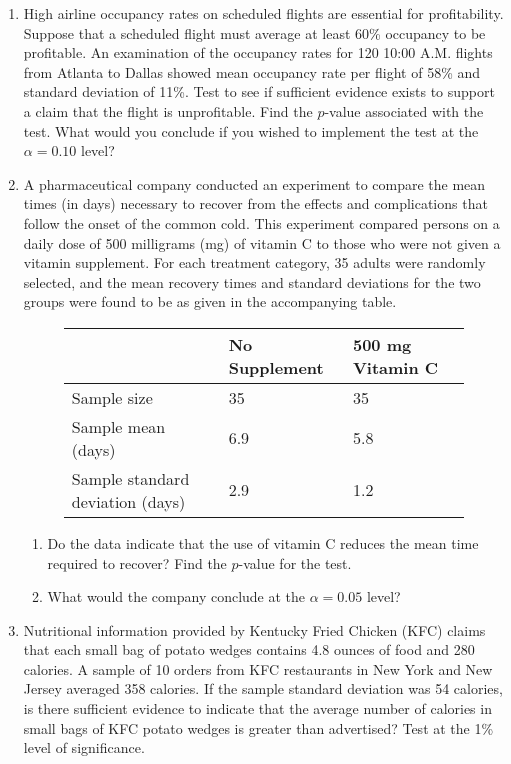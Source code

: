 \documentclass[12pt]{article}
\begin{document}
\begin{enumerate}
\item High airline occupancy rates on scheduled flights are essential for profitability. Suppose that a scheduled flight must average at least 60\% occupancy to be profitable. An examination of the occupancy rates for 120 10:00 A.M. flights from Atlanta to Dallas showed mean occupancy rate per flight of 58\% and standard deviation of 11\%. Test to see if sufficient evidence exists to support a claim that the flight is unprofitable. Find the $p$-value associated with the test. What would you conclude if you wished to implement the test at the $\alpha = 0.10$ level?

\item A pharmaceutical company conducted an experiment to compare the mean times (in days) necessary to recover from the effects and complications that follow the onset of the common cold. This experiment compared persons on a daily dose of 500 milligrams (mg) of vitamin C to those who were not given a vitamin supplement. For each treatment category, 35 adults were randomly selected, and the mean recovery times and standard deviations for the two groups were found to be as given in the accompanying table.
\begin{figure}[H]
\centering
\begin{tabular}{l@{\hskip 2cm}l@{\hskip 2cm}l}
\toprule
& No Supplement & 500 mg Vitamin C \\
\midrule
Sample size & 35 & 35 \\
Sample mean (days) & 6.9 & 5.8 \\
Sample standard deviation (days) & 2.9 & 1.2 \\
\bottomrule
\end{tabular}
\end{figure} 
\begin{enumerate}
\item Do the data indicate that the use of vitamin C reduces the mean time required to recover? Find the $p$-value for the test.
\item What would the company conclude at the $\alpha = 0.05$ level?
\end{enumerate}

\item Nutritional information provided by Kentucky Fried Chicken (KFC) claims that each small bag of potato wedges contains 4.8 ounces of food and 280 calories. A sample of 10 orders from KFC restaurants in New York and New Jersey averaged 358 calories.
If the sample standard deviation was 54 calories, is there sufficient evidence to indicate that the average number of calories in small bags of KFC potato wedges is greater than advertised? Test at the 1\% level of significance.

\end{enumerate}
\end{document}
